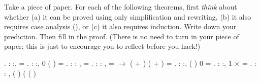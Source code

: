 \documentclass[12pt]{report}
\begin{document}
 Take a piece of paper.  For each of the following theorems, first
    \textit{think} about whether (a) it can be proved using only
    simplification and rewriting, (b) it also requires case
    analysis (), or (c) it also requires induction.  Write
    down your prediction.  Then fill in the proof.  (There is no need
    to turn in your piece of paper; this is just to encourage you to
    reflect before you hack!) \begin{coqdoccode}
\coqdocemptyline
\coqdocnoindent
{} .\coqdoceol
\coqdocemptyline
\coqdocnoindent
{}  : \coqdockw{\ensuremath{\forall}} :,\coqdoceol
\coqdocindent{1.00em}
 =   .\coqdoceol
 \coqdocemptyline
\coqdocnoindent
{}  : \coqdockw{\ensuremath{\forall}} :,\coqdoceol
\coqdocindent{1.00em}
 0 ( ) = .\coqdoceol
 \coqdocemptyline
\coqdocnoindent
{}  : \coqdockw{\ensuremath{\forall}}  : ,\coqdoceol
\coqdocindent{1.00em}
   = .\coqdoceol
 \coqdocemptyline
\coqdocnoindent
{}  : \coqdockw{\ensuremath{\forall}}    : ,\coqdoceol
\coqdocindent{1.00em}
   =  \ensuremath{\rightarrow}  ( + ) ( + ) = .\coqdoceol
 \coqdocemptyline
\coqdocnoindent
{}  : \coqdockw{\ensuremath{\forall}} :,\coqdoceol
\coqdocindent{1.00em}
 ( ) 0 = .\coqdoceol
 \coqdocemptyline
\coqdocnoindent
{}  : \coqdockw{\ensuremath{\forall}} :, 1 \ensuremath{\times}  = .\coqdoceol
 \coqdocemptyline
\coqdocnoindent
{}  : \coqdockw{\ensuremath{\forall}}   : ,\coqdoceol
\coqdocindent{2.00em}
\coqdoceol
\coqdocindent{3.00em}
(  )\coqdoceol
\coqdocindent{3.00em}
( ( )\coqdoceol
\coqdocindent{7.50em}

\end{coqdoccode}
\end{document}
